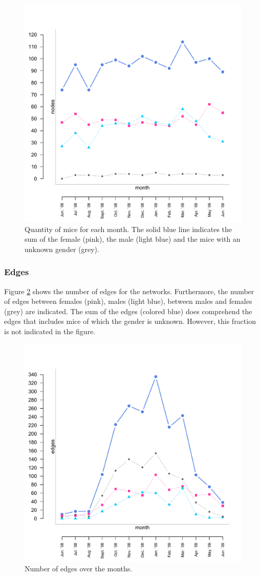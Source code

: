 \begin{figure}[htpb]
\begin{center}
  \includegraphics[width=.6\textwidth]{assets/pdf/long_nodes.pdf}
  \caption[Number of mice over the months]{Quantity of mice for each month. The solid blue line indicates the sum of the female (pink), the male (light blue) and the mice with an unknown gender (grey).}
  \label{fig:long_node}
\end{center}
\end{figure}

\subsubsection{Edges}

Figure \ref{fig:long_edges} shows the number of edges for the networks. Furthermore, the number of edges between females (pink), males (light blue), between males and females (grey) are indicated. The sum of the edges (colored blue) does comprehend the edges that includes mice of which the gender is unknown. However, this fraction is not indicated in the figure.

\begin{figure}[htpb]
\begin{center}
  \includegraphics[width=.6\textwidth]{assets/pdf/long_edges.pdf}
  \caption[Number of edges over the months]{Number of edges over the months.}
  \label{fig:long_edges}
\end{center}
\end{figure}


